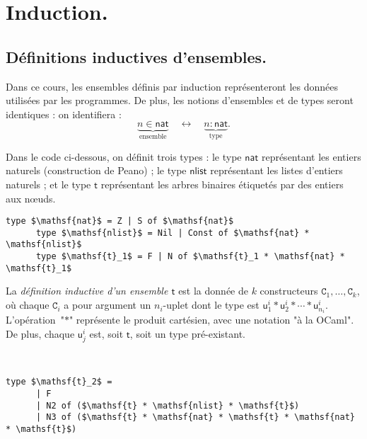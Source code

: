 \documentclass[../main]{subfiles}
\begin{document}
  \chapter{Induction.}\label{sec:induction} \label{thprog-chap01}

  \minitoc

  \section{Définitions inductives d'ensembles.}

  Dans ce cours, les ensembles définis par induction représenteront les données utilisées par les programmes.
  De plus, les notions d'ensembles et de types seront identiques : on identifiera :
  \[
    \underbrace{n \in \mathsf{nat}}_\text{ensemble} \quad\longleftrightarrow\quad \underbrace{n : \mathsf{nat}}_\text{type}
  .\]

  \begin{exm}
    Dans le code ci-dessous, on définit trois types : le type $\mathsf{nat}$ représentant les entiers naturels (construction de Peano) ; le type $\mathsf{nlist}$ représentant les listes d'entiers naturels ; et le type $\mathsf{t}$ représentant les arbres binaires étiquetés par des entiers aux nœuds.

    \begin{lstlisting}[language=caml,caption=Trois types définis inductivement]
      type $\mathsf{nat}$ = Z | S of $\mathsf{nat}$
      type $\mathsf{nlist}$ = Nil | Const of $\mathsf{nat} * \mathsf{nlist}$
      type $\mathsf{t}_1$ = F | N of $\mathsf{t}_1 * \mathsf{nat} * \mathsf{t}_1$
    \end{lstlisting}
  \end{exm}

  \begin{defn}
    La \textit{définition inductive d'un ensemble $\mathsf{t}$} est la donnée de $k$ constructeurs $\mathtt{C}_1, \ldots, \mathtt{C}_k$, où chaque $\mathtt{C}_i$ a pour argument un $n_i$-uplet dont le type est $\mathsf{u}_1^i * \mathsf{u}_2^i * \cdots * \mathsf{u}_{n_i}^i$.
    L'opération~"$*$" représente le produit cartésien, avec une notation "à la OCaml".
    De plus, chaque $\mathsf{u}_j^i$ est, soit $\mathsf{t}$, soit un type pré-existant.
  \end{defn}

  \begin{exm}\label{exm:ind-t2-def}
    ~
    \begin{lstlisting}[language=caml,caption=Un exemple de type]
      type $\mathsf{t}_2$ =
      | F
      | N2 of ($\mathsf{t} * \mathsf{nlist} * \mathsf{t}$)
      | N3 of ($\mathsf{t} * \mathsf{nat} * \mathsf{t} * \mathsf{nat} * \mathsf{t}$)
    \end{lstlisting}
  \end{exm}
\end{document}
